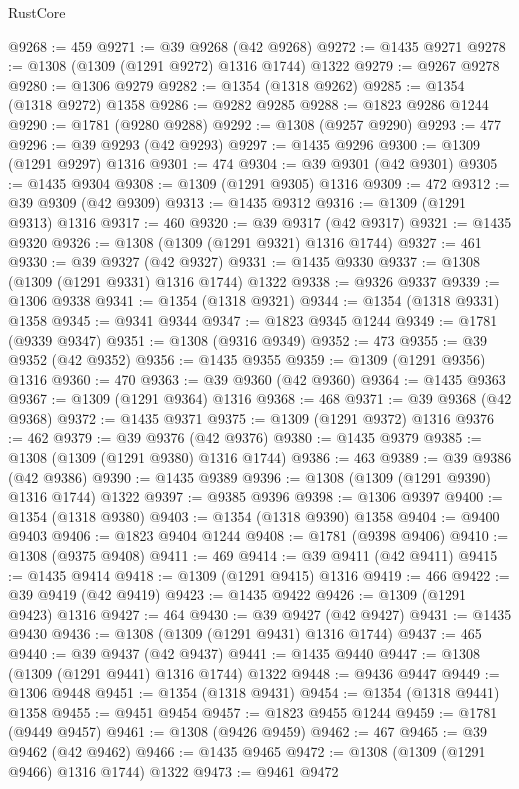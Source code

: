 \begin{lexlean}{RustCore}
\begin{coremodule}
@9268 := 459
@9271 := @39 @9268 (@42 @9268)
@9272 := @1435 @9271
@9278 := @1308 (@1309 (@1291 @9272) @1316 @1744) @1322
@9279 := @9267 @9278
@9280 := @1306 @9279
@9282 := @1354 (@1318 @9262)
@9285 := @1354 (@1318 @9272) @1358
@9286 := @9282 @9285
@9288 := @1823 @9286 @1244
@9290 := @1781 (@9280 @9288)
@9292 := @1308 (@9257 @9290)
@9293 := 477
@9296 := @39 @9293 (@42 @9293)
@9297 := @1435 @9296
@9300 := @1309 (@1291 @9297) @1316
@9301 := 474
@9304 := @39 @9301 (@42 @9301)
@9305 := @1435 @9304
@9308 := @1309 (@1291 @9305) @1316
@9309 := 472
@9312 := @39 @9309 (@42 @9309)
@9313 := @1435 @9312
@9316 := @1309 (@1291 @9313) @1316
@9317 := 460
@9320 := @39 @9317 (@42 @9317)
@9321 := @1435 @9320
@9326 := @1308 (@1309 (@1291 @9321) @1316 @1744)
@9327 := 461
@9330 := @39 @9327 (@42 @9327)
@9331 := @1435 @9330
@9337 := @1308 (@1309 (@1291 @9331) @1316 @1744) @1322
@9338 := @9326 @9337
@9339 := @1306 @9338
@9341 := @1354 (@1318 @9321)
@9344 := @1354 (@1318 @9331) @1358
@9345 := @9341 @9344
@9347 := @1823 @9345 @1244
@9349 := @1781 (@9339 @9347)
@9351 := @1308 (@9316 @9349)
@9352 := 473
@9355 := @39 @9352 (@42 @9352)
@9356 := @1435 @9355
@9359 := @1309 (@1291 @9356) @1316
@9360 := 470
@9363 := @39 @9360 (@42 @9360)
@9364 := @1435 @9363
@9367 := @1309 (@1291 @9364) @1316
@9368 := 468
@9371 := @39 @9368 (@42 @9368)
@9372 := @1435 @9371
@9375 := @1309 (@1291 @9372) @1316
@9376 := 462
@9379 := @39 @9376 (@42 @9376)
@9380 := @1435 @9379
@9385 := @1308 (@1309 (@1291 @9380) @1316 @1744)
@9386 := 463
@9389 := @39 @9386 (@42 @9386)
@9390 := @1435 @9389
@9396 := @1308 (@1309 (@1291 @9390) @1316 @1744) @1322
@9397 := @9385 @9396
@9398 := @1306 @9397
@9400 := @1354 (@1318 @9380)
@9403 := @1354 (@1318 @9390) @1358
@9404 := @9400 @9403
@9406 := @1823 @9404 @1244
@9408 := @1781 (@9398 @9406)
@9410 := @1308 (@9375 @9408)
@9411 := 469
@9414 := @39 @9411 (@42 @9411)
@9415 := @1435 @9414
@9418 := @1309 (@1291 @9415) @1316
@9419 := 466
@9422 := @39 @9419 (@42 @9419)
@9423 := @1435 @9422
@9426 := @1309 (@1291 @9423) @1316
@9427 := 464
@9430 := @39 @9427 (@42 @9427)
@9431 := @1435 @9430
@9436 := @1308 (@1309 (@1291 @9431) @1316 @1744)
@9437 := 465
@9440 := @39 @9437 (@42 @9437)
@9441 := @1435 @9440
@9447 := @1308 (@1309 (@1291 @9441) @1316 @1744) @1322
@9448 := @9436 @9447
@9449 := @1306 @9448
@9451 := @1354 (@1318 @9431)
@9454 := @1354 (@1318 @9441) @1358
@9455 := @9451 @9454
@9457 := @1823 @9455 @1244
@9459 := @1781 (@9449 @9457)
@9461 := @1308 (@9426 @9459)
@9462 := 467
@9465 := @39 @9462 (@42 @9462)
@9466 := @1435 @9465
@9472 := @1308 (@1309 (@1291 @9466) @1316 @1744) @1322
@9473 := @9461 @9472

\end{coremodule}
\end{lexlean}
